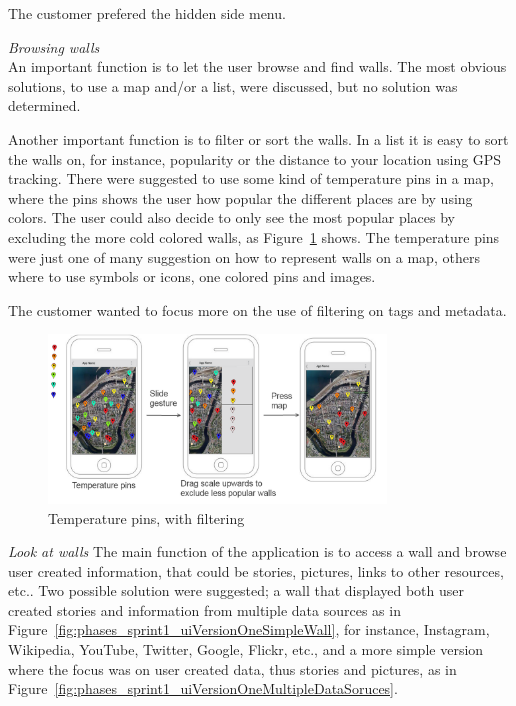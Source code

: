 \documentclass[11pt]{book}
\begin{document}
The customer prefered the hidden side menu.

\textit{Browsing walls}\\
An important function is to let the user browse and find walls. The most obvious solutions, to use a map and/or a list, were discussed, but no solution was determined. 

Another important function is to filter or sort the walls. In a list it is easy to sort the walls on, for instance, popularity or the distance to your location using GPS tracking. There were suggested to use some kind of temperature pins in a map, where the pins shows the user how popular the different places are by using colors. The user could also decide to only see the most popular places by excluding the more cold colored walls, as Figure~\ref{fig:phases_sprint1_uiVersionOneTempPings} shows. The temperature pins were just one of many suggestion on how to represent walls on a map, others where to use symbols or icons, one colored pins and images.

The customer wanted to focus more on the use of filtering on tags and metadata.

\begin{figure}[H]
    \centering
    \includegraphics[width=0.8\textwidth]{Figures/Phases/Sprint1/versiononeTempPings.png}
    \caption{Temperature pins, with filtering}
    \label{fig:phases_sprint1_uiVersionOneTempPings}
\end{figure}

\textit{Look at walls}
The main function of the application is to access a wall and browse user created information, that could be stories, pictures, links to other resources, etc.. Two possible solution were suggested; a wall that displayed both user created stories and information from multiple data sources as in Figure~\ref{fig:phases_sprint1_uiVersionOneSimpleWall}, for instance, Instagram, Wikipedia, YouTube, Twitter, Google, Flickr, etc., and a more simple version where the focus was on user created data, thus stories and pictures, as in Figure~\ref{fig:phases_sprint1_uiVersionOneMultipleDataSoruces}.
\end{document}

